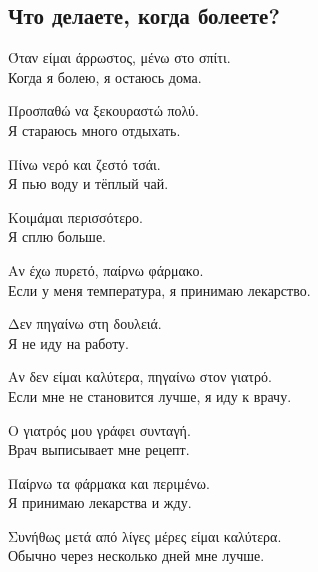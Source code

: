 \documentclass[12pt]{article}
\newcommand{\my}[1]{\textcolor{gray!80!white}{#1}}
\newenvironment{page}{\clearpage\normalsize\null\vfill}{\vfill\null}
\newenvironment{textblock}{\begin{minipage}{\textwidth}}{\end{minipage}\smallskip}
\begin{document}
	\begin{page}
		\subsection{Что делаете, когда болеете?}
		\small
		\begin{textblock}
			Όταν είμαι άρρωστος, μένω στο σπίτι.\\
			\my{Когда я болею, я остаюсь дома.}
			
			Προσπαθώ να ξεκουραστώ πολύ.\\
			\my{Я стараюсь много отдыхать.}
			
			Πίνω νερό και ζεστό τσάι.\\
			\my{Я пью воду и тёплый чай.}
			
			Κοιμάμαι περισσότερο.\\
			\my{Я сплю больше.}
			
			Αν έχω πυρετό, παίρνω φάρμακο.\\
			\my{Если у меня температура, я принимаю лекарство.}
			
			Δεν πηγαίνω στη δουλειά.\\
			\my{Я не иду на работу.}
			
			Αν δεν είμαι καλύτερα, πηγαίνω στον γιατρό.\\
			\my{Если мне не становится лучше, я иду к врачу.}
			
			Ο γιατρός μου γράφει συνταγή.\\
			\my{Врач выписывает мне рецепт.}
			
			Παίρνω τα φάρμακα και περιμένω.\\
			\my{Я принимаю лекарства и жду.}
			
			Συνήθως μετά από λίγες μέρες είμαι καλύτερα.\\
			\my{Обычно через несколько дней мне лучше.}
		\end{textblock}
	\end{page}
	
\end{document}
